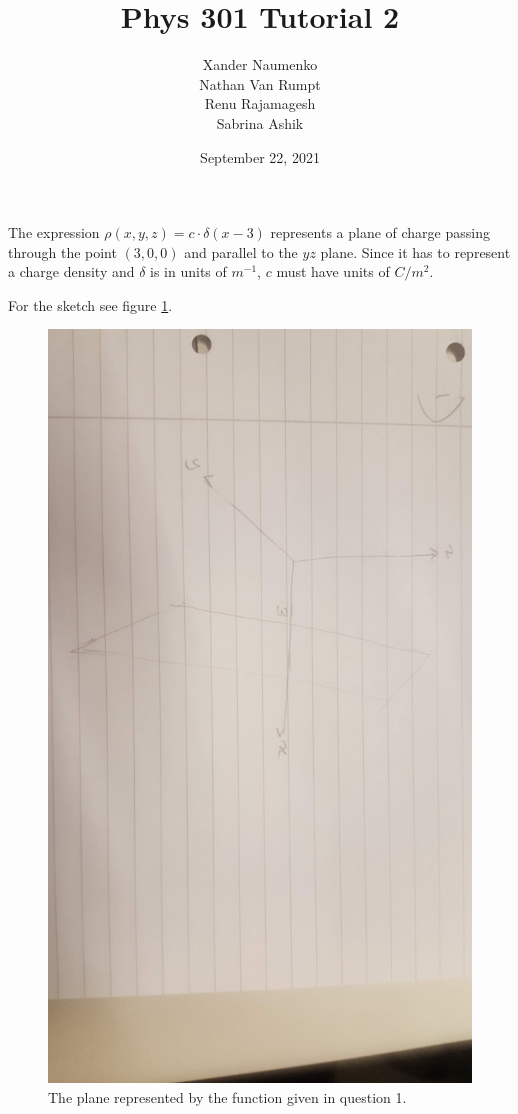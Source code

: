 \documentclass[letterpaper, reqno,11pt]{article}
\begin{document}
\title{Phys 301 Tutorial 2}
\date{September 22, 2021}
\author{Xander Naumenko\\
Nathan Van Rumpt\\
Renu Rajamagesh\\
Sabrina Ashik
}
\newtheorem{thm}{Theorem}
\maketitle

 The expression $\rho(x, y, z)=c\cdot \delta(x-3)$ represents a plane of charge passing through the point $(3, 0, 0)$ and parallel to the $yz$ plane. Since it has to represent a charge density and $\delta$ is in units of $m^{-1}$, $c$ must have units of $C/m^2$.  

For the sketch see figure \ref{fig:plane}. 

\begin{figure}[htbp]
\centering
\includegraphics[width=\textwidth]{images/plane.jpg}
\caption{The plane represented by the function given in question 1. }
\label{fig:plane}
\end{figure}
\end{document}
